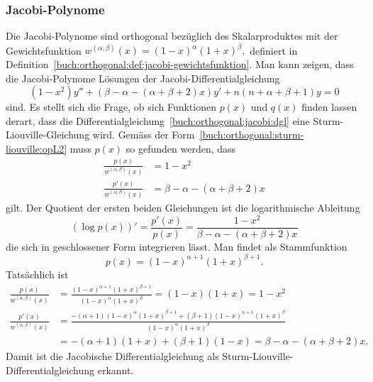 \subsubsection{Jacobi-Polynome}
Die Jacobi-Polynome sind orthogonal bezüglich des Skalarproduktes
mit der Gewichtsfunktion
\(
w^{(\alpha,\beta)}(x) = (1-x)^\alpha(1+x)^\beta,
\)
definiert in Definition~\ref{buch:orthogonal:def:jacobi-gewichtsfunktion}.
Man kann zeigen, dass die Jacobi-Polynome Lösungen der
Jacobi-Differentialgleichung
\begin{equation}
(1-x^2)y'' + (\beta-\alpha-(\alpha+\beta + 2)x)y' + n(n+\alpha+\beta+1)y=0
\label{buch:orthogonal:jacobi:dgl}
\end{equation}
sind.
Es stellt sich die Frage, ob sich Funktionen $p(x)$ und $q(x)$ finden lassen
derart, dass die Differentialgleichung~\eqref{buch:orthogonal:jacobi:dgl}
eine Sturm-Liouville-Gleichung wird.
Gemäss der Form~\eqref{buch:orthogonal:sturm-liouville:opL2} muss
$p(x)$ so gefunden werden, dass
\begin{align*}
\frac{p(x)}{w^{(\alpha,\beta)}(x)} &= 1-x^2 \\
\frac{p'(x)}{w^{(\alpha,\beta)}(x)} &= \beta-\alpha-(\alpha+\beta+2)x
\end{align*}
gilt.
Der Quotient der ersten beiden Gleichungen ist die logarithmische Ableitung
\[
(\log p(x))'
=
\frac{p'(x)}{p(x)}
=
\frac{1-x^2}{\beta-\alpha-(\alpha+\beta+2)x}
\]
die sich in geschlossener Form integrieren lässt.
Man findet als Stammfunktion
\[
p(x)
=
(1-x)^{\alpha+1}(1+x)^{\beta+1}.
\]
Tatsächlich ist
\begin{align*}
\frac{p(x)}{w^{(\alpha,\beta)}(x)}
&=
\frac{(1-x)^{\alpha+1}(1+x)^{\beta+1}}{(1-x)^\alpha(1+x)^\beta}
=
(1-x)(1+x)=1-x^2
\\
\frac{p'(x)}{w^{(\alpha,\beta)}(x)}
&=
\frac{
-(\alpha+1)
(1-x)^{\alpha}(1+x)^{\beta+1}
+
(\beta+1)
(1-x)^{\alpha+1}(1+x)^{\beta}
}{
(1-x)^{\alpha}(1+x)^{\beta}
}
\\
&=
-(\alpha+1)(1+x) + (\beta+1)(1-x)
=
\beta-\alpha-(\alpha+\beta+2)x.
\end{align*}
Damit ist
die Jacobische Differentialgleichung 
als Sturm-Liouville-Differentialgleichung erkannt.

%
%
